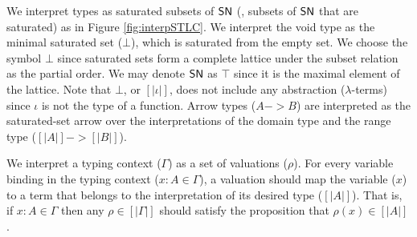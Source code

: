 We interpret types as saturated subsets of $\mathsf{SN}$ (\ie, subsets of $\mathsf{SN}$ that
are saturated) as in Figure \ref{fig:interpSTLC}. We interpret the void type as
the minimal saturated set ($\bot$), which is saturated from the empty set.
We choose the symbol $\bot$ since saturated sets form a complete lattice
under the subset relation as the partial order. We may denote $\mathsf{SN}$ as $\top$
since it is the maximal element of the lattice. Note that $\bot$,
or $[|\iota|]$, does not include any abstraction ($\lambda$-terms)
since $\iota$ is not the type of a function. Arrow types ($A -> B$) are
interpreted as the saturated-set arrow over the interpretations of
the domain type and the range type ($[|A|] -> [|B|]$).

We interpret a typing context ($\Gamma$) as a set of valuations ($\rho$).
For every variable binding in the typing context ($x:A \in \Gamma$),
a valuation should map the variable ($x$) to a term that belongs to
the interpretation of its desired type ($[|A|]$). That is,
if $x : A \in \Gamma$ then any $\rho \in [|\Gamma|]$ should
satisfy the proposition that $\rho(x) \in [|A|]$.

